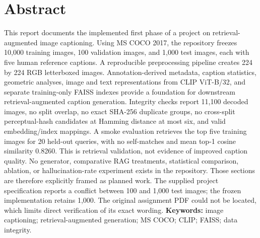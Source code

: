 \documentclass[12pt,a4paper,oneside]{report}
\begin{document}
\chapter*{Abstract}
This report documents the implemented first phase of a project on retrieval-augmented image captioning. Using MS COCO 2017, the repository freezes 10,000 training images, 100 validation images, and 1,000 test images, each with five human reference captions. A reproducible preprocessing pipeline creates 224 by 224 RGB letterboxed images. Annotation-derived metadata, caption statistics, geometric analyses, image and text representations from CLIP ViT-B/32, and separate training-only FAISS indexes provide a foundation for downstream retrieval-augmented caption generation. Integrity checks report 11,100 decoded images, no split overlap, no exact SHA-256 duplicate groups, no cross-split perceptual-hash candidates at Hamming distance at most six, and valid embedding/index mappings. A smoke evaluation retrieves the top five training images for 20 held-out queries, with no self-matches and mean top-1 cosine similarity 0.8260. This is retrieval validation, not evidence of improved caption quality. No generator, comparative RAG treatments, statistical comparison, ablation, or hallucination-rate experiment exists in the repository. Those sections are therefore explicitly framed as planned work. The supplied project specification reports a conflict between 100 and 1,000 test images; the frozen implementation retains 1,000. The original assignment PDF could not be located, which limits direct verification of its exact wording.
\textbf{Keywords:} image captioning; retrieval-augmented generation; MS COCO; CLIP; FAISS; data integrity.







\appendix



\end{document}
